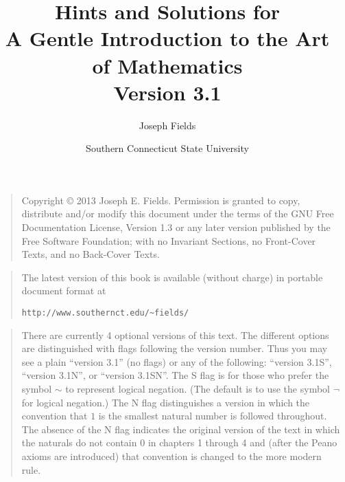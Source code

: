 \documentclass[dvips,12pt,twoside]{book}
\let\savedlnot\lnot
\begin{document}
\frontmatter

\title{Hints and Solutions for \\
A Gentle Introduction to the Art of Mathematics\\ {\small Version 3.1
 }}
\author{Joseph Fields}
\date{Southern Connecticut State University}

\maketitle

\clearpage

\rule{0pt}{0pt}

\vfill

\begin{quote}
    Copyright \copyright{}  2013  Joseph E. Fields.
    Permission is granted to copy, distribute and/or modify this document
    under the terms of the GNU Free Documentation License, Version 1.3
    or any later version published by the Free Software Foundation;
    with no Invariant Sections, no Front-Cover Texts, and no Back-Cover Texts.
\end{quote}

\vfill

\begin{quote}
The latest version of this book is available (without charge) in portable document format at \newline
\rule{0pt}{0pt} \hspace{1in} \verb+http://www.southernct.edu/~fields/+
\end{quote}

\vfill

\begin{quote}
There are currently 4 optional versions of this text.  The different options are distinguished with
flags following the version number.  Thus you may see a plain ``version  3.1'' (no flags) 
or any of the following: ``version 3.1S'', ``version 3.1N'',  or ``version 3.1SN''. 
The S flag is for those who prefer the symbol $\sim$ to represent 
logical negation.  (The default is to
use the symbol $\savedlnot$ for logical negation.)  The N flag distinguishes a version in which
the convention that $1$ is the smallest natural number is followed throughout.  The absence
of the N flag indicates the original version of the text in which the naturals do not contain $0$
in chapters 1 through 4 and (after the Peano axioms are introduced) that convention is changed
to the more modern rule. 

\end{quote}

\vfill

\clearpage

\mainmatter










\end{document}
